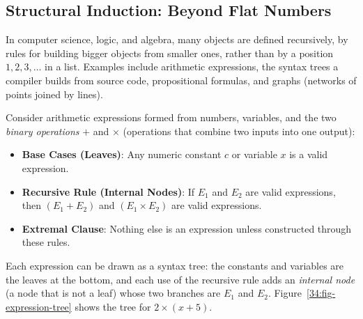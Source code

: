 \subsection{Structural Induction: Beyond Flat Numbers}

In computer science, logic, and algebra, many objects are defined recursively, by rules for building bigger objects from smaller ones, rather than by a position $1, 2, 3, \dots$ in a list. Examples include arithmetic expressions, the syntax trees a compiler builds from source code, propositional formulas, and graphs (networks of points joined by lines).

Consider arithmetic expressions formed from numbers, variables, and the two \emph{binary operations} $+$ and $\times$ (operations that combine two inputs into one output):
\begin{itemize}
  \item \textbf{Base Cases (Leaves)}: Any numeric constant $c$ or variable $x$ is a valid expression.
  \item \textbf{Recursive Rule (Internal Nodes)}: If $E_1$ and $E_2$ are valid expressions, then $(E_1 + E_2)$ and $(E_1 \times E_2)$ are valid expressions.
  \item \textbf{Extremal Clause}: Nothing else is an expression unless constructed through these rules.
\end{itemize}
Each expression can be drawn as a syntax tree: the constants and variables are the leaves at the bottom, and each use of the recursive rule adds an \emph{internal node} (a node that is not a leaf) whose two branches are $E_1$ and $E_2$. Figure~\ref{34:fig-expression-tree} shows the tree for $2 \times (x + 5)$.

